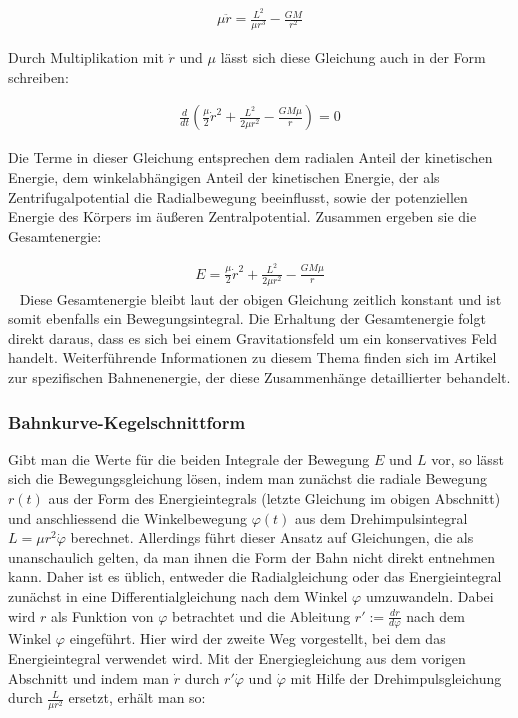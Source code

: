 \documentclass[a4paper,12pt,twoside]{article}
\begin{document}
\begin{align*}
	\mu \ddot{r} = \frac{L^2}{\mu r^3} - \frac{G M}{r^2}
\end{align*}

Durch Multiplikation mit \( \dot{r} \) und \( \mu \) lässt sich diese Gleichung auch in der Form schreiben:

\begin{align*}
	\frac{d}{dt} \left( \frac{\mu}{2} \dot{r}^2 + \frac{L^2}{2 \mu r^2} - \frac{GM \mu}{r} \right) = 0
\end{align*}

Die Terme in dieser Gleichung entsprechen dem radialen Anteil der kinetischen Energie, dem winkelabhängigen Anteil der kinetischen Energie, der als Zentrifugalpotential die Radialbewegung beeinflusst, sowie der potenziellen Energie des Körpers im äußeren Zentralpotential. Zusammen ergeben sie die Gesamtenergie:

\begin{align*}
	E = \frac{\mu}{2} \dot{r}^2 + \frac{L^2}{2 \mu r^2} - \frac{GM \mu}{r}
\end{align*} ~\cite{Physik-Schule}
Diese Gesamtenergie bleibt laut der obigen Gleichung zeitlich konstant und ist somit ebenfalls ein Bewegungsintegral. Die Erhaltung der Gesamtenergie folgt direkt daraus, dass es sich bei einem Gravitationsfeld um ein konservatives Feld handelt. Weiterführende Informationen zu diesem Thema finden sich im Artikel zur spezifischen Bahnenenergie, der diese Zusammenhänge detaillierter behandelt.


\subsubsection{Bahnkurve-Kegelschnittform}

Gibt man die Werte für die beiden Integrale der Bewegung \( E \) und \( L \) vor, so lässt sich die Bewegungsgleichung lösen, indem man zunächst die radiale Bewegung \( r(t) \) aus der Form des Energieintegrals (letzte Gleichung im obigen Abschnitt) und anschliessend die Winkelbewegung \( \varphi(t) \) aus dem Drehimpulsintegral \( L = \mu r^2 \dot{\varphi} \) berechnet. 
Allerdings führt dieser Ansatz auf Gleichungen, die als unanschaulich gelten, da man ihnen die Form der Bahn nicht direkt entnehmen kann. 
Daher ist es üblich, entweder die Radialgleichung oder das Energieintegral zunächst in eine Differentialgleichung nach dem Winkel \( \varphi \) umzuwandeln. Dabei wird \( r \) als Funktion von \( \varphi \) betrachtet und die Ableitung \( r' := \frac{dr}{d\varphi} \) nach dem Winkel \( \varphi \) eingeführt. 
Hier wird der zweite Weg vorgestellt, bei dem das Energieintegral verwendet wird. 
Mit der Energiegleichung aus dem vorigen Abschnitt und indem man \( \dot{r} \) durch \( r' \dot{\varphi} \) und \( \dot{\varphi} \) mit Hilfe der Drehimpulsgleichung durch \( \frac{L}{\mu r^2} \) ersetzt, erhält man so:
\end{document}
